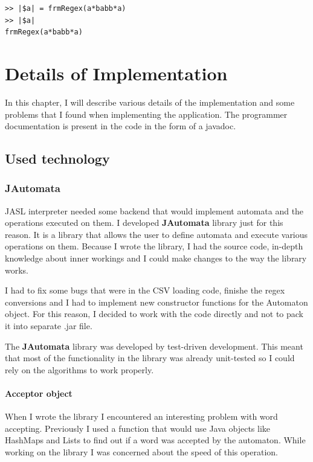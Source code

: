 \documentclass{ctuthesis}
\begin{document}
\begin{minipage}{\linewidth}
\begin{lstlisting}[language = JASL_snippet]
>> |$a| = frmRegex(a*babb*a)
>> |$a|
frmRegex(a*babb*a)
\end{lstlisting}
\end{minipage}

\chapter{Details of Implementation}
In this chapter, I will describe various details of the implementation and some problems that I found when implementing the application. The programmer documentation is present in the code in the form of a javadoc.

\section{Used technology}
\subsection{JAutomata}
JASL interpreter needed some backend that would implement automata and the operations executed on them. I developed \textbf{JAutomata} library just for this reason. It is a library that allows the user to define automata and execute various operations on them. Because I wrote the library, I had the source code, in-depth knowledge about inner workings and I could make changes to the way the library works. 

I had to fix some bugs that were in the CSV loading code, finishe the regex conversions and I had to implement new constructor functions for the Automaton object. For this reason, I decided to work with the code directly and not to pack it into separate .jar file. 

The \textbf{JAutomata} library was developed by test-driven development. This meant that most of the functionality in the library was already unit-tested so I could rely on the algorithms to work properly. 

\subsubsection{Acceptor object}
When I wrote the library I encountered an interesting problem with word accepting. Previously I used a function that would use Java objects like HashMaps and Lists to find out if a word was accepted by the automaton. While working on the library I was concerned about the speed of this operation. 
\end{document}
